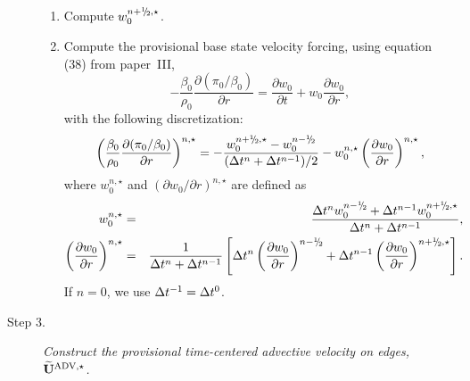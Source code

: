 \begin{description}
\begin{enumerate}
\item Compute $w_0^{\nph,\star}$.

\item Compute the provisional base state velocity forcing, using equation (38)
  from paper~III,
\begin{equation}
-\frac{\beta_0}{\rho_0} \frac{\partial (\pi_0/\beta_0)}{\partial r} = \frac{\partial w_0}{\partial t} + w_0 \frac{\partial w_0}{\partial r}, \label{eq:pizero}
\end{equation}
  with the following discretization:
\begin{equation}
\left ( \frac{\beta_0}{\rho_0} \frac{\partial (\pi_0/\beta_0)}{\partial r} \right )^{n,\star} = -\frac{w_0^{\nph,\star} - w_0^\nmh}{(\dt^n+\dt^{n-1})/2} - w_0^{n,\star} \left(\frac{\partial w_0}{\partial r}\right)^{n,\star},
\end{equation} 
  where $w_0^{n,\star}$ and $(\partial w_0 / \partial r)^{n,\star}$ are defined as
\begin{eqnarray}
w_0^{n,\star} &=& \frac{\dt^{n} w_0^{\nmh} + \dt^{n-1} w_0^{\nph,\star}}{\dt^n+\dt^{n-1}}, \\
\left(\frac{\partial w_0}{\partial r}\right)^{n,\star} &=& \frac{1}{\dt^n+\dt^{n-1}}\left [ \dt^{n} \left(\frac{\partial w_0 }{ \partial r}\right)^{\nmh} + \dt^{n-1} \left(\frac{\partial w_0 }{ \partial r}\right)^{\nph,\star} \right ].\nonumber \\
\end{eqnarray}
  If $n=0$, we use $\Delta t^{-1} = \Delta t^0$.
\end{enumerate}

\item[Step 3.] {\em Construct the provisional time-centered advective velocity on 
edges, $\widetilde{\mathbf{U}}^{\mathrm{ADV},\star}$.}


\end{description}
